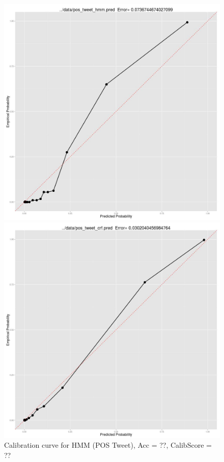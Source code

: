 \begin{figure}
  \includegraphics[width=\linewidth]{pos_tweet_hmm_pred.jpg}
  \caption{Calibration curve for HMM (POS Tweet), Acc = ??, CalibScore = ??}
  \label{fig:pos_tweet_hmm_pred}
\endminipage\hfill
{}
  \includegraphics[width=\linewidth]{pos_tweet_crf_pred.jpg}

\end{figure}
